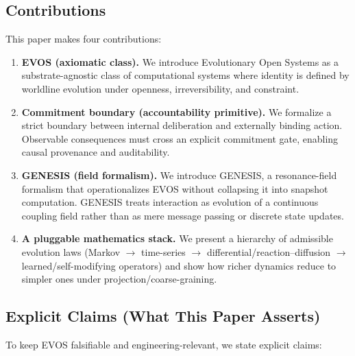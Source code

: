\documentclass[11pt]{article}
\begin{document}
\vspace{0.75em}
\subsection{Contributions}

This paper makes four contributions:

\begin{enumerate}
  \item \textbf{EVOS (axiomatic class).} We introduce Evolutionary Open Systems as a
  substrate-agnostic class of computational systems where identity is defined by
  worldline evolution under openness, irreversibility, and constraint.

  \item \textbf{Commitment boundary (accountability primitive).} We formalize a strict
  boundary between internal deliberation and externally binding action. Observable
  consequences must cross an explicit commitment gate, enabling causal provenance
  and auditability.

  \item \textbf{GENESIS (field formalism).} We introduce GENESIS, a resonance-field
  formalism that operationalizes EVOS without collapsing it into snapshot computation.
  GENESIS treats interaction as evolution of a continuous coupling field rather than
  as mere message passing or discrete state updates.

  \item \textbf{A pluggable mathematics stack.} We present a hierarchy of admissible
  evolution laws (Markov $\to$ time-series $\to$ differential/reaction--diffusion
  $\to$ learned/self-modifying operators) and show how richer dynamics reduce to
  simpler ones under projection/coarse-graining.
\end{enumerate}

\vspace{0.5em}
\subsection{Explicit Claims (What This Paper Asserts)}

To keep EVOS falsifiable and engineering-relevant, we state explicit claims:
\end{document}

